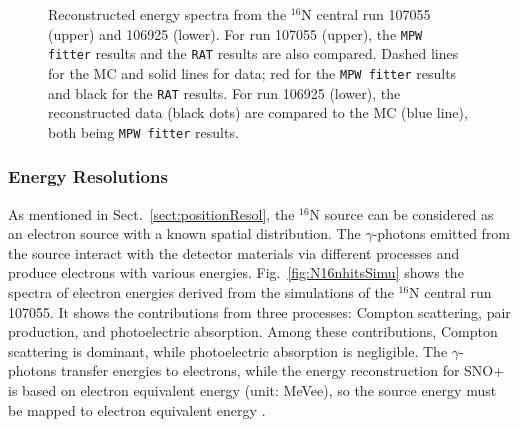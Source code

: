\begin{figure}[htbp]
	\centering
	\caption[Reconstructed energy spectra from the $^{16}$N central run 107055 and 106925.]{Reconstructed energy spectra from the $^{16}$N central run 107055 (upper) and 106925 (lower). For run 107055 (upper), the \texttt{MPW fitter} results and the \texttt{RAT} results are also compared. Dashed lines for the MC and solid lines for data; red for the \texttt{MPW fitter} results and black for the \texttt{RAT} results. For run 106925 (lower), the reconstructed data (black dots) are compared to the MC (blue line), both being \texttt{MPW fitter} results.\label{fig:N16energy}}
\end{figure}

\subsubsection{Energy Resolutions}
As mentioned in Sect.~\ref{sect:positionResol}, the $^{16}$N source can be considered as an electron source with a known spatial distribution. The $\gamma$-photons emitted from the source interact with the detector materials via different processes and produce electrons with various energies. Fig.~\ref{fig:N16nhitsSimu} shows the spectra of electron energies derived from the simulations of the $^{16}$N central run 107055. It shows the contributions from three processes: Compton scattering, pair production, and photoelectric absorption. Among these contributions, Compton scattering is dominant, while photoelectric absorption is negligible. The $\gamma$-photons transfer energies to electrons, while the energy reconstruction for SNO+ is based on electron equivalent energy (unit: MeVee), so the source energy must be mapped to electron equivalent energy \cite{morganThesis}. 

